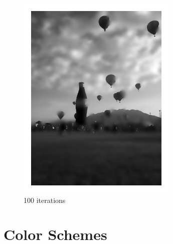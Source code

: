 \begin{figure}[ht]
\begin{minipage}[b]{0.45\linewidth}
\includegraphics[width=\textwidth]{figures/coke_balloon_100iters.pdf}
\caption*{100 iterations}
\end{minipage}
\end{figure}
\vfill
\clearpage

\section*{Color Schemes}

